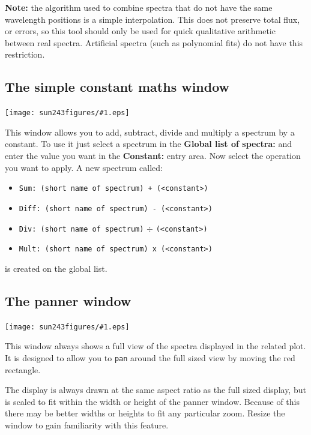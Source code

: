 \documentclass[twoside,11pt]{article}
\newcommand{\htmladdimg}[1]{}
\newcommand{\latexhtml}[2]{#1}
\renewcommand{\_}{\texttt{\symbol{95}}}
\newcommand{\mainfigure}[1]
{\begin{center}
 \latexhtml{\texttt{[image: sun243\_figures/\#1.eps]}}{\htmladdimg{#1.gif}}
 \end{center}
}
\newcommand{\labelitem}[1]{\textbf{#1}}
\newcommand{\hitext}[1]{\texttt{#1}}
\begin{document}
\textbf{Note:} the algorithm used to combine spectra that do not have
the same wavelength positions is a simple interpolation. This does not
preserve total flux, or errors, so this tool should only be used for
quick qualitative arithmetic between real spectra. Artificial spectra
(such as polynomial fits) do not have this restriction.

\newpage
\subsection{The simple constant maths window}

\mainfigure{unarymathwindow}

This window allows you to add, subtract, divide and multiply a
spectrum by a constant. To use it just select a spectrum in the
\labelitem{Global list of spectra:} and enter the value you want in
the \labelitem{Constant:} entry area.
Now select the operation you want to apply. A new spectrum called:
\begin{itemize}
  \item \hitext{Sum: (short name of spectrum) + (<constant>)}
  \item \hitext{Diff: (short name of spectrum) - (<constant>)}
  \item \hitext{Div: (short name of spectrum)} $\div$ \hitext{(<constant>)}
  \item \hitext{Mult: (short name of spectrum) x (<constant>)}
\end{itemize}
is created on the global list.

\newpage
\subsection{The panner window}

\mainfigure{pannerwindow}

This window always shows a full view of the spectra displayed in
the related plot. It is designed to allow you to \hitext{pan} around
the full sized view by moving the red rectangle.

The display is always drawn at the same aspect ratio as the full sized
display, but is scaled to fit within the width or height of the panner
window. Because of this there may be better widths or heights to fit
any particular zoom. Resize the window to gain familiarity with this
feature.
\end{document}
